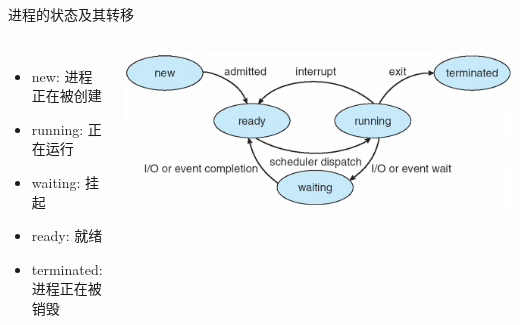 \documentclass[xcolor=svgnames]{beamer}
\begin{document}
\begin{CJK*}{UTF8}{gbsn}
\begin{frame}{进程的状态及其转移}
\begin{columns}%
\begin{itemize}
\item new: 进程正在被创建
\item running: 正在运行
\item waiting: 挂起
\item ready: 就绪
\item terminated: 进程正在被销毁
\end{itemize}
\includegraphics[width=1.0\textwidth]{state.png}
\end{columns}
\end{frame}


\end{CJK*}
\end{document}

